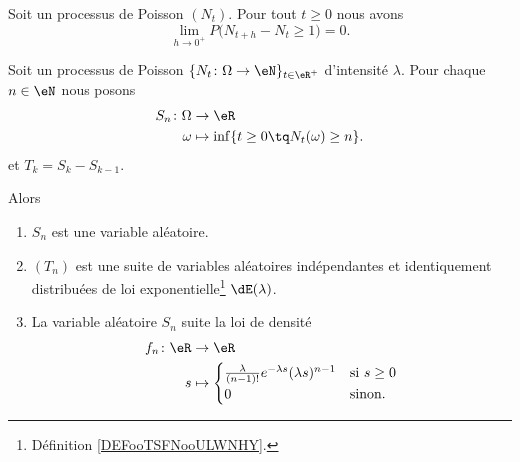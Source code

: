 \begin{proposition}   \label{PROPooGMBBooCIkVCB}
    Soit un processus de Poisson \( (N_t)\). Pour tout \( t\geq 0\) nous avons
    \begin{equation}
        \lim_{h\to 0^+} P\big( N_{t+h}-N_t\geq 1 \big)=0.
    \end{equation}
\end{proposition}

\begin{theorem}     \label{THOooYRIMooSREVEO}
    Soit un processus de Poisson \(  \{ N_t\colon \Omega\to \eN \}_{t\in \eR^+}  \) d'intensité \( \lambda\). Pour chaque \( n\in \eN\) nous posons
    \begin{equation}
        \begin{aligned}
            S_n\colon \Omega&\to \eR \\
            \omega&\mapsto \inf\{ t\geq 0\tq N_t(\omega)\geq n \}. 
        \end{aligned}
    \end{equation}
    et \( T_k=S_k-S_{k-1}\).

    Alors
    \begin{enumerate}
        \item       \label{ITEMooSLWOooRjYhBA}
            \( S_n\) est une variable aléatoire.    
        \item
            \( (T_n)\) est une suite de variables aléatoires indépendantes et identiquement distribuées de loi exponentielle\footnote{Définition \ref{DEFooTSFNooULWNHY}.} \( \dE(\lambda)\).
        \item
            La variable aléatoire \( S_n\) suite la loi de densité
            \begin{equation}
                \begin{aligned}
                    f_n\colon \eR&\to \eR \\
                    s&\mapsto \begin{cases}
                        \frac{ \lambda }{ (n-1)! } e^{-\lambda s}(\lambda s)^{n-1}    &   \text{si } s\geq 0\\
                        0    &    \text{sinon. }
                    \end{cases}\\
                \end{aligned}
            \end{equation}
    \end{enumerate}
\end{theorem}

